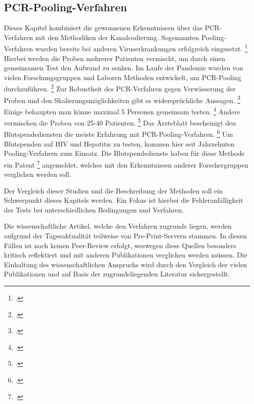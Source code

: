 \subsection{PCR-Pooling-Verfahren}
Dieses Kapitel kombiniert die gewonnenen Erkenntnissen über das PCR-Verfahren mit den Methodiken der Kanalcodierung.
Sogenannten Pooling-Verfahren wurden bereits bei anderen Viruserkrankungen erfolgreich eingesetzt.
\footcite{Aertzeblatt}
Hierbei werden die Proben mehrerer Patienten vermischt, um durch einen gemeinsamen Test den Aufwand zu senken.
Im Laufe der Pandemie wurden von vielen Forschungsgruppen und Laboren Methoden entwickelt, um PCR-Pooling durchzuführen.
\footcite{Reddit Quelle}
Zur Robustheit des PCR-Verfahren gegen Verwässerung der Proben und den Skalierungsmöglichkeiten gibt es widersprüchliche Aussagen.
\footcite{Alternative Quelle Pooling}
Einige behaupten man könne maximal 5 Personen gemeinsam testen.
\footcite{Quelle}
Andere vermischen die Proben von 25-40 Patienten.
\footcite{Quelle}
Das Ärzteblatt bescheinigt den Blutspendediensten die meiste Erfahrung mit PCR-Pooling-Verfahren.
\footcite{Aertzeblatt}
Um Blutspenden auf HIV und Hepatitis zu testen, kommen hier seit Jahrzehnten Pooling-Verfahren zum Einsatz.
Die Blutspendedienste haben für diese Methode ein Patent
\footcite{Patent Blutspende}
angemeldet, welches mit den Erkenntnissen anderer Forschergruppen verglichen werden soll.

Der Vergleich dieser Studien und die Beschreibung der Methoden soll ein Schwerpunkt dieses Kapitels werden.
Ein Fokus ist hierbei die Fehleranfälligkeit der Tests bei unterschiedlichen Bedingungen und Verfahren.

Die wissenschaftliche Artikel, welche den Verfahren zugrunde liegen, werden aufgrund der Tagesaktualität teilweise von Pre-Print-Servern stammen.
In diesen Fällen ist noch keinen Peer-Review erfolgt, weswegen diese Quellen besonders kritisch reflektiert und mit anderen Publikationen verglichen werden müssen.
Die Einhaltung des wissenschaftlichen Anspruchs wird durch den Vergleich der vielen Publikationen und auf Basis der zugrundeliegenden Literatur sichergestellt.